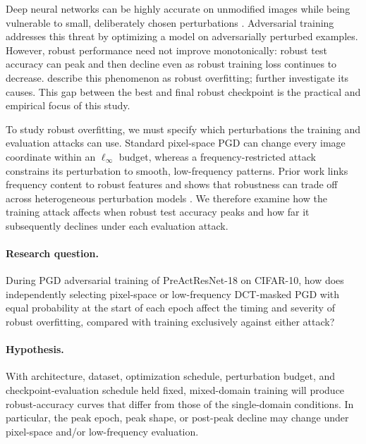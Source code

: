\documentclass{article}
\newcommand{\linf}{\ell_\infty}
\begin{document}
Deep neural networks can be highly accurate on unmodified images while being
vulnerable to small, deliberately chosen perturbations
\citep{goodfellow2015,rice2020}. Adversarial training addresses this threat by
optimizing a model on adversarially perturbed examples. However, robust
performance need not improve monotonically: robust test accuracy can peak and
then decline even as robust training loss continues to decrease.
\citet{rice2020} describe this phenomenon as robust overfitting;
\citet{yu2022} further investigate its causes. This gap between the best and
final robust checkpoint is the practical and empirical focus of this study.

To study robust overfitting, we must specify which perturbations the training
and evaluation attacks can use. Standard pixel-space PGD
can change every image coordinate within an $\linf$ budget, whereas a
frequency-restricted attack constrains its perturbation to smooth,
low-frequency patterns. Prior work links frequency content to robust features
and shows that robustness can trade off across heterogeneous perturbation
models \citep{tramer2019,guo2020,maini2020,bu2023}. We therefore examine how the training attack affects when robust test accuracy
peaks and how far it subsequently declines under each evaluation attack.

\paragraph{Research question.}
During PGD adversarial training of PreActResNet-18 on CIFAR-10, how does
independently selecting pixel-space or low-frequency DCT-masked PGD with equal
probability at the start of each epoch affect the timing and severity of robust
overfitting, compared with training exclusively against either attack?

\paragraph{Hypothesis.}
With architecture, dataset, optimization schedule, perturbation budget, and
checkpoint-evaluation schedule held fixed, mixed-domain training will produce
robust-accuracy curves that differ from those of the single-domain conditions. In
particular, the peak epoch, peak shape, or post-peak decline may change under
pixel-space and/or low-frequency evaluation.
\end{document}
